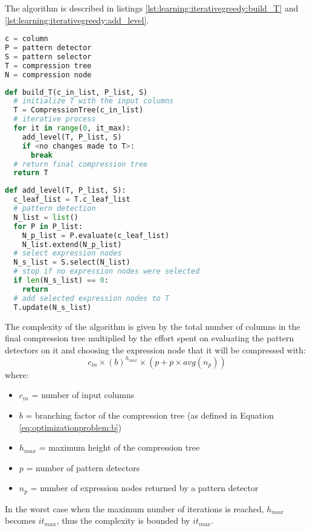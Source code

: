 The algorithm is described in listings \ref{lst:learning:iterativegreedy:build_T} and \ref{lst:learning:iterativegreedy:add_level}.

\begin{lstlisting}[language=Python,
label={lst:learning:iterativegreedy:naming},
caption={Naming conventions}]
c = column
P = pattern detector
S = pattern selector
T = compression tree
N = compression node
\end{lstlisting}

\begin{lstlisting}[language=Python,
label={lst:learning:iterativegreedy:build_T},
caption={build\_T (iterative greedy)}]
def build_T(c_in_list, P_list, S)
  # initialize T with the input columns
  T = CompressionTree(c_in_list)
  # iterative process
  for it in range(0, it_max):
    add_level(T, P_list, S)
    if <no changes made to T>:
      break
  # return final compression tree
  return T
\end{lstlisting}

\begin{lstlisting}[language=Python,
label={lst:learning:iterativegreedy:add_level},
caption={add\_level (iterative greedy)}]
def add_level(T, P_list, S):
  c_leaf_list = T.c_leaf_list
  # pattern detection 
  N_list = list()
  for P in P_list:
    N_p_list = P.evaluate(c_leaf_list)
    N_list.extend(N_p_list)
  # select expression nodes
  N_s_list = S.select(N_list)
  # stop if no expression nodes were selected
  if len(N_s_list) == 0:
    return
  # add selected expression nodes to T
  T.update(N_s_list)
\end{lstlisting}
\bigskip

The complexity of the algorithm is given by the total number of columns in the final compression tree multiplied by the effort spent on evaluating the pattern detectors on it and choosing the expression node that it will be compressed with:
\begin{equation}
\label{eq:learning:recursiveexhaustive}
    c_{in} \times (b) ^ {h_{max}} \times (p + p \times \mathit{avg}(n_{p}))
\end{equation}
where:
\begin{itemize}
    \item[] \(c_{in}\) = number of input columns
    \item[] \(b\) = branching factor of the compression tree (as defined in Equation \ref{eq:optimizationproblem:b})
    \item[] \(h_{max}\) = maximum height of the compression tree
    \item[] \(p\) = number of pattern detectors
    \item[] \(n_{p}\) = number of expression nodes returned by a pattern detector
\end{itemize}
In the worst case when the maximum number of iterations is reached, \(h_{max}\) becomes \(it_{max}\), thus the complexity is bounded by \(it_{max}\).

